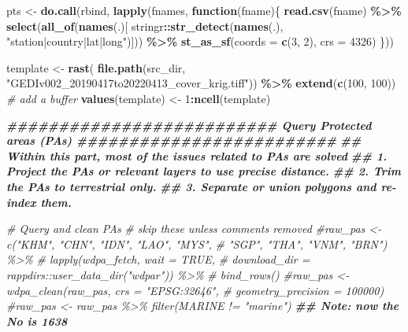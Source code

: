 \documentclass[
]{article}
\newenvironment{Shaded}{\begin{snugshade}}{\end{snugshade}}
\newcommand{\AttributeTok}[1]{\textcolor[rgb]{0.13,0.29,0.53}{#1}}
\newcommand{\CommentTok}[1]{\textcolor[rgb]{0.56,0.35,0.01}{\textit{#1}}}
\newcommand{\ControlFlowTok}[1]{\textcolor[rgb]{0.13,0.29,0.53}{\textbf{#1}}}
\newcommand{\DecValTok}[1]{\textcolor[rgb]{0.00,0.00,0.81}{#1}}
\newcommand{\DocumentationTok}[1]{\textcolor[rgb]{0.56,0.35,0.01}{\textbf{\textit{#1}}}}
\newcommand{\FunctionTok}[1]{\textcolor[rgb]{0.13,0.29,0.53}{\textbf{#1}}}
\newcommand{\NormalTok}[1]{#1}
\newcommand{\OtherTok}[1]{\textcolor[rgb]{0.56,0.35,0.01}{#1}}
\newcommand{\SpecialCharTok}[1]{\textcolor[rgb]{0.81,0.36,0.00}{\textbf{#1}}}
\newcommand{\StringTok}[1]{\textcolor[rgb]{0.31,0.60,0.02}{#1}}
\begin{document}
\begin{Shaded}
\begin{Highlighting}[]
\NormalTok{pts }\OtherTok{\textless{}{-}} \FunctionTok{do.call}\NormalTok{(rbind, }\FunctionTok{lapply}\NormalTok{(fnames, }\ControlFlowTok{function}\NormalTok{(fname)\{}
    \FunctionTok{read.csv}\NormalTok{(fname) }\SpecialCharTok{\%\textgreater{}\%} 
        \FunctionTok{select}\NormalTok{(}\FunctionTok{all\_of}\NormalTok{(}\FunctionTok{names}\NormalTok{(.)[}
\NormalTok{            stringr}\SpecialCharTok{::}\FunctionTok{str\_detect}\NormalTok{(}\FunctionTok{names}\NormalTok{(.), }\StringTok{"station|country|lat|long"}\NormalTok{)])) }\SpecialCharTok{\%\textgreater{}\%} 
        \FunctionTok{st\_as\_sf}\NormalTok{(}\AttributeTok{coords =} \FunctionTok{c}\NormalTok{(}\DecValTok{3}\NormalTok{, }\DecValTok{2}\NormalTok{), }\AttributeTok{crs =} \DecValTok{4326}\NormalTok{)}
\NormalTok{\}))}

\NormalTok{template }\OtherTok{\textless{}{-}} \FunctionTok{rast}\NormalTok{(}
    \FunctionTok{file.path}\NormalTok{(src\_dir, }\StringTok{"GEDIv002\_20190417to20220413\_cover\_krig.tiff"}\NormalTok{)) }\SpecialCharTok{\%\textgreater{}\%} 
    \FunctionTok{extend}\NormalTok{(}\FunctionTok{c}\NormalTok{(}\DecValTok{100}\NormalTok{, }\DecValTok{100}\NormalTok{)) }\CommentTok{\# add a buffer}
\FunctionTok{values}\NormalTok{(template) }\OtherTok{\textless{}{-}} \DecValTok{1}\SpecialCharTok{:}\FunctionTok{ncell}\NormalTok{(template)}

\DocumentationTok{\#\#\#\#\#\#\#\#\#\#\#\#\#\#\#\#\#\#\#\#\#\#\#\#\#\# Query Protected areas (PAs) \#\#\#\#\#\#\#\#\#\#\#\#\#\#\#\#\#\#\#\#\#\#\#\#\#}
\DocumentationTok{\#\# Within this part, most of the issues related to PAs are solved }
\DocumentationTok{\#\# 1. Project the PAs or relevant layers to use precise distance.}
\DocumentationTok{\#\# 2. Trim the PAs to terrestrial only.}
\DocumentationTok{\#\# 3. Separate or union polygons and re{-}index them.}

\CommentTok{\# Query and clean PAs}
\CommentTok{\# skip these unless comments removed}
\CommentTok{\#raw\_pas \textless{}{-} c("KHM", "CHN", "IDN", "LAO", "MYS", }
\CommentTok{\#             "SGP", "THA", "VNM", "BRN") \%\textgreater{}\%}
\CommentTok{\#    lapply(wdpa\_fetch, wait = TRUE,}
\CommentTok{\#           download\_dir = rappdirs::user\_data\_dir("wdpar")) \%\textgreater{}\%}
\CommentTok{\#    bind\_rows()}
\CommentTok{\#raw\_pas \textless{}{-} wdpa\_clean(raw\_pas, crs = "EPSG:32646",}
\CommentTok{\#                      geometry\_precision = 100000)}
\CommentTok{\#raw\_pas \textless{}{-} raw\_pas \%\textgreater{}\% filter(MARINE != "marine")}
\DocumentationTok{\#\# Note: now the No is 1638}


\end{Highlighting}
\end{Shaded}
\end{document}
